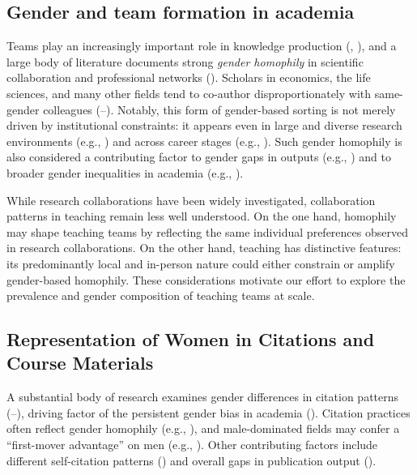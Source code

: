 \documentclass[
  british,
  12pt, %
]{article}
\begin{document}
\subsection{Gender and team formation in academia}\label{gender-and-team-formation-in-academia}

Teams play an increasingly important role in knowledge production (, ), and a large body of literature documents strong \emph{gender homophily} in scientific collaboration and professional networks (). Scholars in economics, the life sciences, and many other fields tend to co-author disproportionately with same-gender colleagues (--). Notably, this form of gender-based sorting is not merely driven by institutional constraints: it appears even in large and diverse research environments (e.g., ) and across career stages (e.g., ). Such gender homophily is also considered a contributing factor to gender gaps in outputs (e.g., ) and to broader gender inequalities in academia (e.g., ).

While research collaborations have been widely investigated, collaboration patterns in teaching remain less well understood. On the one hand, homophily may shape teaching teams by reflecting the same individual preferences observed in research collaborations. On the other hand, teaching has distinctive features: its predominantly local and in-person nature could either constrain or amplify gender-based homophily. These considerations motivate our effort to explore the prevalence and gender composition of teaching teams at scale.

\subsection{Representation of Women in Citations and Course Materials}\label{representation-of-women-in-citations-and-course-materials}

A substantial body of research examines gender differences in citation patterns (--), driving factor of the persistent gender bias in academia (). Citation practices often reflect gender homophily (e.g., ), and male-dominated fields may confer a ``first-mover advantage'' on men (e.g., ). Other contributing factors include different self-citation patterns () and overall gaps in publication output ().
\end{document}
